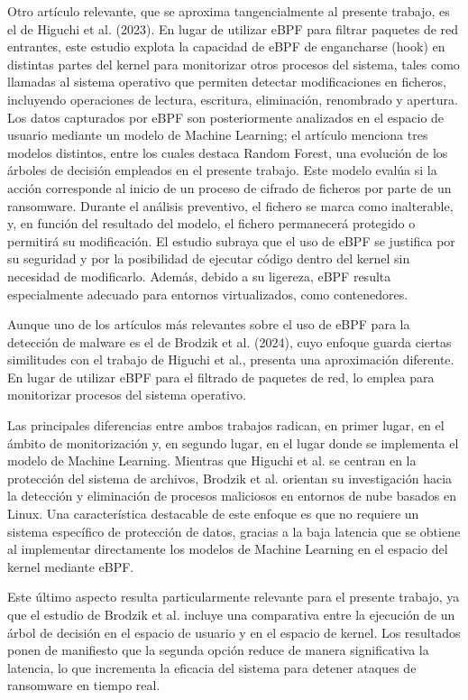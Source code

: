 Otro artículo relevante, que se aproxima tangencialmente al presente trabajo, es el de Higuchi et al. (2023)\cite{Higuchi2023RealTime}. En lugar de utilizar eBPF para filtrar paquetes de red entrantes, este estudio explota la capacidad de eBPF de engancharse (hook) en distintas partes del kernel para monitorizar otros procesos del sistema, tales como llamadas al sistema operativo que permiten detectar modificaciones en ficheros, incluyendo operaciones de lectura, escritura, eliminación, renombrado y apertura. Los datos capturados por eBPF son posteriormente analizados en el espacio de usuario mediante un modelo de Machine Learning; el artículo menciona tres modelos distintos, entre los cuales destaca Random Forest, una evolución de los árboles de decisión empleados en el presente trabajo. Este modelo evalúa si la acción corresponde al inicio de un proceso de cifrado de ficheros por parte de un ransomware. Durante el análisis preventivo, el fichero se marca como inalterable, y, en función del resultado del modelo, el fichero permanecerá protegido o permitirá su modificación. El estudio subraya que el uso de eBPF se justifica por su seguridad y por la posibilidad de ejecutar código dentro del kernel sin necesidad de modificarlo. Además, debido a su ligereza, eBPF resulta especialmente adecuado para entornos virtualizados, como contenedores.

Aunque uno de los artículos más relevantes sobre el uso de eBPF para la detección de malware es el de Brodzik et al. (2024)\cite{Brodzik2024RansomwareKernel}, cuyo enfoque guarda ciertas similitudes con el trabajo de Higuchi et al., presenta una aproximación diferente. En lugar de utilizar eBPF para el filtrado de paquetes de red, lo emplea para monitorizar procesos del sistema operativo.

Las principales diferencias entre ambos trabajos radican, en primer lugar, en el ámbito de monitorización y, en segundo lugar, en el lugar donde se implementa el modelo de Machine Learning. Mientras que Higuchi et al. se centran en la protección del sistema de archivos, Brodzik et al. orientan su investigación hacia la detección y eliminación de procesos maliciosos en entornos de nube basados en Linux. Una característica destacable de este enfoque es que no requiere un sistema específico de protección de datos, gracias a la baja latencia que se obtiene al implementar directamente los modelos de Machine Learning en el espacio del kernel mediante eBPF.

Este último aspecto resulta particularmente relevante para el presente trabajo, ya que el estudio de Brodzik et al. incluye una comparativa entre la ejecución de un árbol de decisión en el espacio de usuario y en el espacio de kernel. Los resultados ponen de manifiesto que la segunda opción reduce de manera significativa la latencia, lo que incrementa la eficacia del sistema para detener ataques de ransomware en tiempo real.

